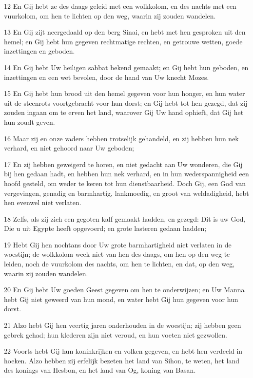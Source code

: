 \par 12 En Gij hebt ze des daags geleid met een wolkkolom, en des nachts met een vuurkolom, om hen te lichten op den weg, waarin zij zouden wandelen.
\par 13 En Gij zijt neergedaald op den berg Sinai, en hebt met hen gesproken uit den hemel; en Gij hebt hun gegeven rechtmatige rechten, en getrouwe wetten, goede inzettingen en geboden.
\par 14 En Gij hebt Uw heiligen sabbat bekend gemaakt; en Gij hebt hun geboden, en inzettingen en een wet bevolen, door de hand van Uw knecht Mozes.
\par 15 En Gij hebt hun brood uit den hemel gegeven voor hun honger, en hun water uit de steenrots voortgebracht voor hun dorst; en Gij hebt tot hen gezegd, dat zij zouden ingaan om te erven het land, waarover Gij Uw hand ophieft, dat Gij het hun zoudt geven.
\par 16 Maar zij en onze vaders hebben trotselijk gehandeld, en zij hebben hun nek verhard, en niet gehoord naar Uw geboden;
\par 17 En zij hebben geweigerd te horen, en niet gedacht aan Uw wonderen, die Gij bij hen gedaan hadt, en hebben hun nek verhard, en in hun wederspannigheid een hoofd gesteld, om weder te keren tot hun dienstbaarheid. Doch Gij, een God van vergevingen, genadig en barmhartig, lankmoedig, en groot van weldadigheid, hebt hen evenwel niet verlaten.
\par 18 Zelfs, als zij zich een gegoten kalf gemaakt hadden, en gezegd: Dit is uw God, Die u uit Egypte heeft opgevoerd; en grote lasteren gedaan hadden;
\par 19 Hebt Gij hen nochtans door Uw grote barmhartigheid niet verlaten in de woestijn; de wolkkolom week niet van hen des daags, om hen op den weg te leiden, noch de vuurkolom des nachts, om hen te lichten, en dat, op den weg, waarin zij zouden wandelen.
\par 20 En Gij hebt Uw goeden Geest gegeven om hen te onderwijzen; en Uw Manna hebt Gij niet geweerd van hun mond, en water hebt Gij hun gegeven voor hun dorst.
\par 21 Alzo hebt Gij hen veertig jaren onderhouden in de woestijn; zij hebben geen gebrek gehad; hun klederen zijn niet veroud, en hun voeten niet gezwollen.
\par 22 Voorts hebt Gij hun koninkrijken en volken gegeven, en hebt hen verdeeld in hoeken. Alzo hebben zij erfelijk bezeten het land van Sihon, te weten, het land des konings van Hesbon, en het land van Og, koning van Basan.
